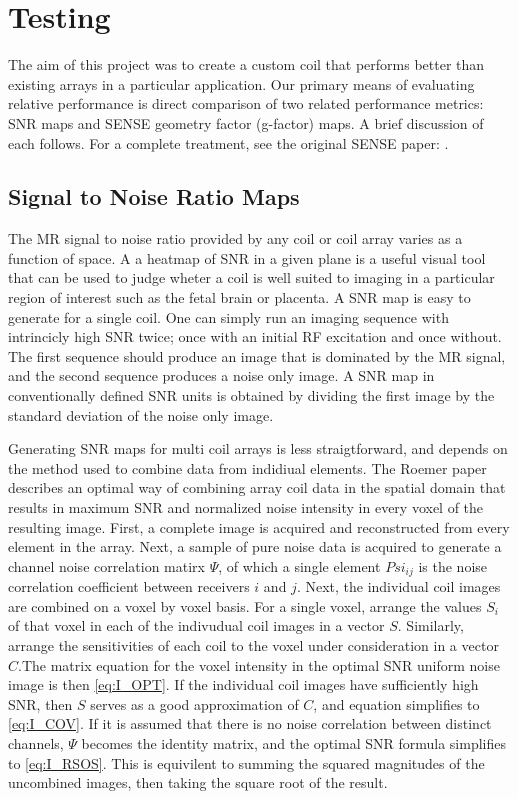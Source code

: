 \chapter{Testing}
The aim of this project was to create a custom coil that performs better than existing arrays in a
particular application. Our primary means of evaluating relative performance is direct comparison of two related
performance metrics: SNR maps and SENSE geometry factor (g-factor) maps. A brief discussion of each follows. For a
complete treatment, see the original SENSE paper: \cite{Pruessmann1999}.

\section{Signal to Noise Ratio Maps}
The MR signal to noise ratio provided by any coil or coil array varies as a function
of space. A a heatmap of SNR in a given plane is a useful visual tool that can be used to judge wheter a coil is well
suited to imaging in a particular region of interest such as the fetal brain or placenta. A SNR map is easy to generate
for a single coil. One can simply run an imaging sequence with intrincicly high SNR twice; once with an initial RF
excitation and once without. The first sequence should produce an image that is dominated by the MR signal, and the
second sequence produces a noise only image. A SNR map in conventionally defined SNR units is obtained by dividing the
first image by the standard deviation of the noise only image.

Generating SNR maps for multi coil arrays is less straigtforward, and depends on the method used to combine data from
indidiual elements. The Roemer paper \cite{Roemer90} describes an optimal way of combining array coil data in the
spatial domain that results in maximum SNR and normalized noise intensity in every voxel of the resulting image.  First,
a complete image is acquired and reconstructed from every element in the array. Next, a sample of pure noise data is
acquired to generate a channel noise correlation matirx $\Psi$, of which a single element $Psi_{ij}$ is the noise
correlation coefficient between receivers $i$ and $j$. Next, the individual coil images are combined on a voxel by voxel
basis. For a single voxel, arrange the values $S_i$ of that voxel in each of the indivudual coil images in a vector $S$.
Similarly, arrange the sensitivities of each coil to the voxel under consideration in a vector $C$.The matrix equation
for the voxel intensity in the optimal SNR uniform noise image is then \ref{eq:I_OPT}. If the individual coil images
have sufficiently high SNR, then $S$ serves as a good approximation of $C$, and equation simplifies to \ref{eq:I_COV}.
If it is assumed that there is no noise correlation between distinct channels, $\Psi$ becomes the identity matrix, and
the optimal SNR formula simplifies to \ref{eq:I_RSOS}. This is equivilent to summing the squared magnitudes of the
uncombined images, then taking the square root of the result.

